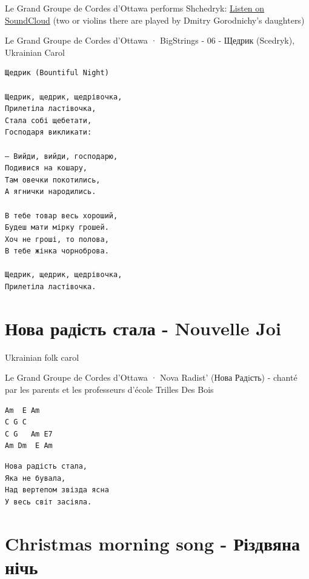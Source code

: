 \documentclass[
]{article}
\begin{document}
Le Grand Groupe de Cordes d'Ottawa performs Shchedryk:
\href{https://soundcloud.app.goo.gl/Q8w6T}{Listen on SoundCloud} (two or
violins there are played by Dmitry Gorodnichy's daughters)

Le Grand Groupe de Cordes d'Ottawa · BigStrings - 06 - Щедрик (Scedryk),
Ukrainian Carol

\begin{verbatim}
Щедрик (Bountiful Night)

Щедрик, щедрик, щедрівочка,
Прилетіла ластівочка,
Стала собі щебетати,
Господаря викликати:

– Вийди, вийди, господарю,
Подивися на кошару,
Там овечки покотились,
А ягнички народились.

В тебе товар весь хороший,
Будеш мати мірку грошей.
Хоч не гроші, то полова,
В тебе жінка чорноброва.

Щедрик, щедрик, щедрівочка,
Прилетіла ластівочка.

\end{verbatim}

\hypertarget{ux43dux43eux432ux430-ux440ux430ux434ux456ux441ux442ux44c-ux441ux442ux430ux43bux430---nouvelle-joi}{%
\section{Нова радість стала - Nouvelle
Joi}\label{ux43dux43eux432ux430-ux440ux430ux434ux456ux441ux442ux44c-ux441ux442ux430ux43bux430---nouvelle-joi}}

Ukrainian folk carol

Le Grand Groupe de Cordes d'Ottawa · Nova Radist' (Нова Радiсть) -
chanté par les parents et les professeurs d'école Trilles Des Bois

\begin{verbatim}
Am  E Am
C G C
C G   Am E7
Am Dm  E Am
\end{verbatim}

\begin{verbatim}
Нова радість стала,
Яка не бувала,
Над вертепом звізда ясна
У весь світ засіяла.
\end{verbatim}

\hypertarget{christmas-morning-song---ux440ux456ux437ux434ux432ux44fux43dux430-ux43dux456ux447ux44c}{%
\section{Christmas morning song - Різдвяна
нічь}\label{christmas-morning-song---ux440ux456ux437ux434ux432ux44fux43dux430-ux43dux456ux447ux44c}}
\end{document}
